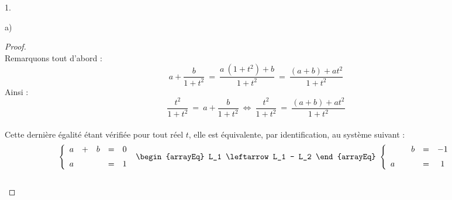 \begin{noliste}{1.}
\begin{noliste}{a)}
    \begin{proof}~\\%
      Remarquons tout d'abord :
        \[
        a + \dfrac{b}{1 + t^2} \ = \ \dfrac{a \ (1 + t^2) + b}{1 +
          t^2} \ = \ \dfrac{(a+b) + a t^2}{1 + t^2}
        \]
        Ainsi :
        \[
        \dfrac{t^2}{1 + t^2} \ = \ a + \dfrac{b}{1 + t^2} \
        \Leftrightarrow \ \dfrac{t^2}{1 + t^2} \ = \ \dfrac{(a+b) + a
          t^2}{1 + t^2}
        \]~\\
        Cette dernière égalité étant vérifiée pour tout réel $t$, elle
        est équivalente, par identification, au système suivant :
        \[
        \left\{
          \begin{array}{ccccc}
            a & + & b & = & 0
            \\[.2cm]
            a & & & = & 1
          \end{array}
        \right. %
        \
        \begin{arrayEq}
          L_1 \leftarrow L_1 - L_2
        \end{arrayEq}
        \ %
        \left\{
          \begin{array}{ccccc}
            & & b & = & -1
            \\[.2cm]
            a & & & = & 1
          \end{array}
        \right.
        \]
        ~\\[-.8cm]
    \end{proof}


\end{noliste}
\end{noliste}
